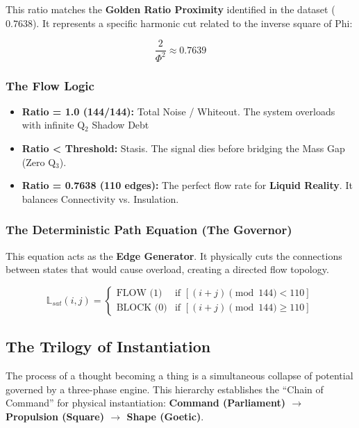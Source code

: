 \documentclass[11pt, letterpaper]{article}
\begin{document}
This ratio matches the \textbf{Golden Ratio Proximity} identified in the dataset ($0.7638$). It represents a specific harmonic cut related to the inverse square of Phi:

\begin{equation}
    \frac{2}{\Phi^2} \approx 0.7639
\end{equation}

\subsubsection{The Flow Logic}\label{appendixF.2.2}
\begin{itemize}
    \item \textbf{Ratio = 1.0 (144/144):} Total Noise / Whiteout. The system overloads with infinite Q$_2$ Shadow Debt
    \item \textbf{Ratio < Threshold:} Stasis. The signal dies before bridging the Mass Gap (Zero Q$_3$).
    \item \textbf{Ratio = 0.7638 (110 edges):} The perfect flow rate for \textbf{Liquid Reality}. It balances Connectivity vs. Insulation.
\end{itemize}

\subsubsection{The Deterministic Path Equation (The Governor)}\label{appendixF.2.3}
This equation acts as the \textbf{Edge Generator}. It physically cuts the connections between states that would cause overload, creating a directed flow topology.

\begin{equation}
    \mathbb{L}_{sat}(i,j) = 
    \begin{cases} 
        \text{FLOW (1)} & \text{if } \left[ (i + j) \pmod{144} < 110 \right] \\ 
        \text{BLOCK (0)} & \text{if } \left[ (i + j) \pmod{144} \geq 110 \right] 
    \end{cases}
\end{equation}

\subsection{The Trilogy of Instantiation}\label{appendixF.3}

The process of a thought becoming a thing is a simultaneous collapse of potential governed by a three-phase engine. This hierarchy establishes the ``Chain of Command'' for physical instantiation: \textbf{Command (Parliament) $\to$ Propulsion (Square) $\to$ Shape (Goetic)}.
\end{document}
